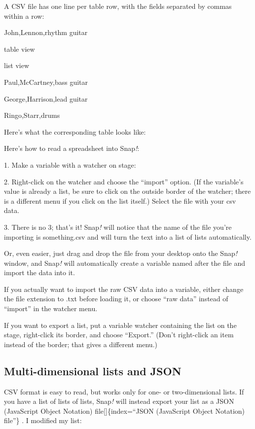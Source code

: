 \documentclass[
  letterpaper,
]{book}
\begin{document}
A CSV file has one line per table row, with the fields separated by
commas within a row:

John,Lennon,rhythm guitar

table view

list view

Paul,McCartney,bass guitar

George,Harrison,lead guitar

Ringo,Starr,drums

Here's what the corresponding table looks like:

Here's how to read a spreadsheet into Snap\emph{!}:

1. Make a variable with a watcher on stage:

2. Right-click on the watcher and choose the ``import'' option. (If the
variable's value is already a list, be sure to click on the outside
border of the watcher; there is a different menu if you click on the
list itself.) Select the file with your csv data.

3. There is no 3; that's it! Snap\emph{!} will notice that the name of
the file you're importing is something.csv and will turn the text into a
list of lists automatically.

Or, even easier, just drag and drop the file from your desktop onto the
Snap\emph{!} window, and Snap\emph{!} will automatically create a
variable named after the file and import the data into it.

If you actually want to import the raw CSV data into a variable, either
change the file extension to .txt before loading it, or choose ``raw
data'' instead of ``import'' in the watcher menu.

If you want to export a list, put a variable watcher containing the list
on the stage, right-click its border, and choose ``Export.'' (Don't
right-click an item instead of the border; that gives a different menu.)

\subsection{Multi-dimensional lists and
JSON}\label{multi-dimensional-lists-and-json}

CSV format is easy to read, but works only for one- or two-dimensional
lists. If you have a list of lists of lists, Snap\emph{!} will instead
export your list as a JSON (JavaScript Object Notation)
file{[}{]}\{index=``JSON (JavaScript Object Notation) file''\} . I
modified my list:
\end{document}
